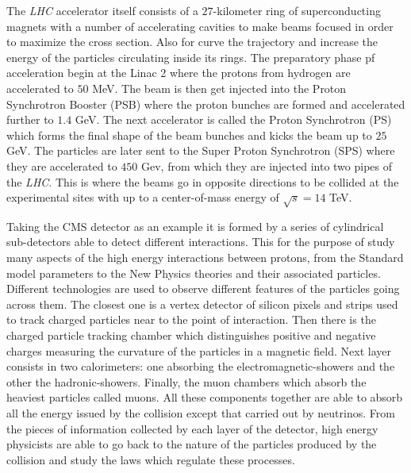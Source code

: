 The \textit{LHC} accelerator itself consists of a $27$-kilometer ring of
superconducting magnets with a number of accelerating cavities to make
beams focused in order to maximize the cross section. Also for curve the
trajectory and increase the energy of the particles circulating inside its
rings. The preparatory phase pf acceleration begin at the Linac 2 where the
protons from hydrogen are accelerated to $50$ MeV. The beam is then get
injected into the Proton Synchrotron Booster (PSB) where the proton bunches
are formed and accelerated further to $1.4$ GeV. The next accelerator is
called the Proton Synchrotron (PS) which forms the final shape of the beam
bunches and kicks the beam up to $25$ GeV. The particles are later sent to
the Super Proton Synchrotron (SPS) where they are accelerated to $450$ Gev,
from which they are injected into two pipes of the \textit{LHC}. This is
where the beams go in opposite directions to be collided at the
experimental sites with up to a center-of-mass energy of $\sqrt{s}=14$ TeV.

Taking the CMS detector as an example it is formed by a series of cylindrical
sub-detectors able to detect different interactions. This for the purpose
of study many aspects of the high energy interactions between protons, from
the Standard model parameters to the New Physics theories and their
associated particles. Different technologies are used to observe different
features of the particles going across them. The closest one is a vertex
detector of silicon pixels and strips used to track charged particles near
to the point of interaction. Then there is the charged particle tracking
chamber which distinguishes positive and negative charges measuring the
curvature of the particles in a magnetic field. Next layer consists in two
calorimeters: one absorbing the electromagnetic-showers and the other the
hadronic-showers. Finally, the muon chambers which absorb the heaviest
particles called muons. All these components together are able to absorb
all the energy issued by the collision except that carried out by
neutrinos. From the pieces of information collected by each layer of the
detector, high energy physicists are able to go back to the nature of the
particles produced by the collision and study the laws which regulate these
processes.

